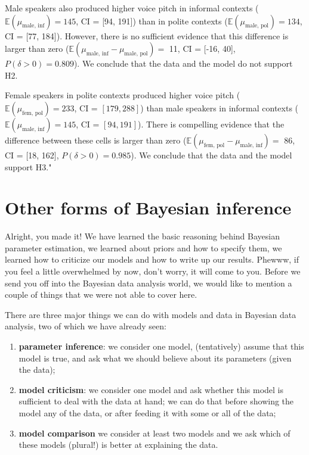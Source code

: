 \documentclass[nobib]{tufte-handout}
\begin{document}
Male speakers also produced higher voice pitch in informal contexts
($\mathbb{E}(\mu_{\text{male, inf}}) = 145$, CI = [94, 191]) than in polite contexts
($\mathbb{E}(\mu_{\text{male, pol}}) = 134$, CI = [77, 184]). However, there is no sufficient
evidence that this difference is larger than zero ($\mathbb{E}(\mu_{\text{male, inf}} - \mu_{\text{male, pol}}) =$ 11, CI =
[-16, 40], $P(\delta > 0) = 0.809$). We conclude that the data and the model do not
support H2.

Female speakers in polite contexts produced higher voice pitch ($\mathbb{E}(\mu_{\text{fem,
    pol}}) = 233$, CI = $[179, 288]$) than male speakers in informal contexts
($\mathbb{E}(\mu_{\text{male, inf}}) = 145$, CI = $[94, 191]$). There is compelling
evidence that the difference between these cells is larger than zero ($\mathbb{E}(\mu_{\text{fem,
    pol}} - \mu_{\text{male, inf}}) = $ 86, CI = [18, 162], $P(\delta >
0) = 0.985$). We conclude that the data and the model support H3."


\section{Other forms of Bayesian inference}

Alright, you made it! We have learned the basic reasoning behind Bayesian parameter estimation,
we learned about priors and how to specify them, we learned how to criticize our models and how
to write up our results. Phewww, if you feel a little overwhelmed by now, don't worry, it will
come to you. Before we send you off into the Bayesian data analysis world, we would like to mention a couple of things that we were not able to cover here.

There are three major things we can do with models and data in Bayesian data analysis, two of which we have already seen:

\begin{enumerate}
\item \textbf{parameter inference}: we consider one model, (tentatively) assume that this model is true, and ask what we should believe about its parameters (given the data);
\item \textbf{model criticism}: we consider one model and ask whether this model is sufficient to deal with the data at hand; we can do that before showing the model any of the data, or after feeding it with some or all of the data;
\item \textbf{model comparison} we consider at least two models and we ask which of these models (plural!) is better at explaining the data.
\end{enumerate}
\end{document}
